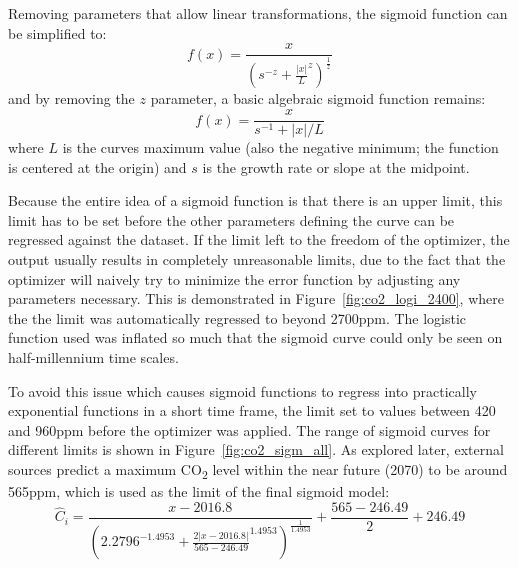 \documentclass[12pt]{mcmthesis}
\begin{document}
    Removing parameters that allow linear transformations, the sigmoid function can be simplified to:
%
    \begin{equation}
        f(x) = \frac{x}{\left(s^{-z}+\frac{\left|x\right|}{L}^{z}\right)^{\frac{1}{z}}}
    \end{equation}
%
    and by removing the $z$ parameter, a basic algebraic sigmoid function remains:
%
    \begin{equation}
        f(x) = \frac{x}{s^{-1}+{\left|x\right|}/{L}}
    \end{equation}
%
    where
    $L$ is the curve\textquotesingle s maximum value (also the negative minimum; the function is centered at the origin) and
    $s$ is the growth rate or slope at the midpoint.

    Because the entire idea of a sigmoid function is that there is an upper limit, this limit has to be set before the other parameters defining the curve can be regressed against the dataset.
    If the limit left to the freedom of the optimizer, the output usually results in completely unreasonable limits, due to the fact that the optimizer will naively try to minimize the error function by adjusting any parameters necessary.
    This is demonstrated in Figure~\ref{fig:co2_logi_2400}, where the the limit was automatically regressed to beyond 2700\si{ppm}.
    The logistic function used was inflated so much that the sigmoid curve could only be seen on half-millennium time scales.

    To avoid this issue which causes sigmoid functions to regress into practically exponential functions in a short time frame, the limit set to values between 420 and 960\si{ppm} before the optimizer was applied. The range of sigmoid curves for different limits is shown in Figure~\ref{fig:co2_sigm_all}. As explored later, external sources predict a maximum CO\textsubscript{2} level within the near future (2070) to be around 565\si{ppm}, which is used as the limit of the final sigmoid model:
%
    \begin{equation}
        \hat C_i = \frac{x-2016.8}{\left(2.2796^{-1.4953}+\frac{2\left|x-2016.8\right|}{565-246.49}^{1.4953}\right)^{\frac{1}{1.4953}}}+\frac{565-246.49}{2}+246.49
        \label{eq:co2_sig}
    \end{equation}
\end{document}
